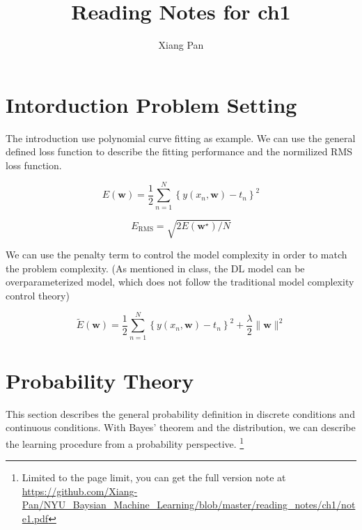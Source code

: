 \documentclass{article}
\title{Reading Notes for ch1}
\author{Xiang Pan}
\begin{document}

\section{Intorduction Problem Setting}
The introduction use polynomial curve fitting as example. We can use the general defined loss function to describe the fitting performance and the normilized RMS loss function.




$$E(\mathbf{w})=\frac{1}{2} \sum_{n=1}^{N}\left\{y\left(x_{n}, \mathbf{w}\right)-t_{n}\right\}^{2}$$

$$E_{\mathrm{RMS}}=\sqrt{2 E\left(\mathbf{w}^{\star}\right) / N}$$

We can use the penalty term to control the model complexity in order to match the problem complexity. (As mentioned in class, the DL model can be overparameterized model, which does not follow the traditional model complexity control theory)

$$\widetilde{E}(\mathbf{w})=\frac{1}{2} \sum_{n=1}^{N}\left\{y\left(x_{n}, \mathbf{w}\right)-t_{n}\right\}^{2}+\frac{\lambda}{2}\|\mathbf{w}\|^{2}$$

\section{Probability Theory} 
This section describes the general probability definition in discrete conditions and continuous conditions. With Bayes' theorem and the distribution, we can describe the learning procedure from a probability perspective. \footnote{Limited to the page limit, you can get the full version note at \url{https://github.com/Xiang-Pan/NYU_Baysian_Machine_Learning/blob/master/reading_notes/ch1/note1.pdf} }
\end{document}

